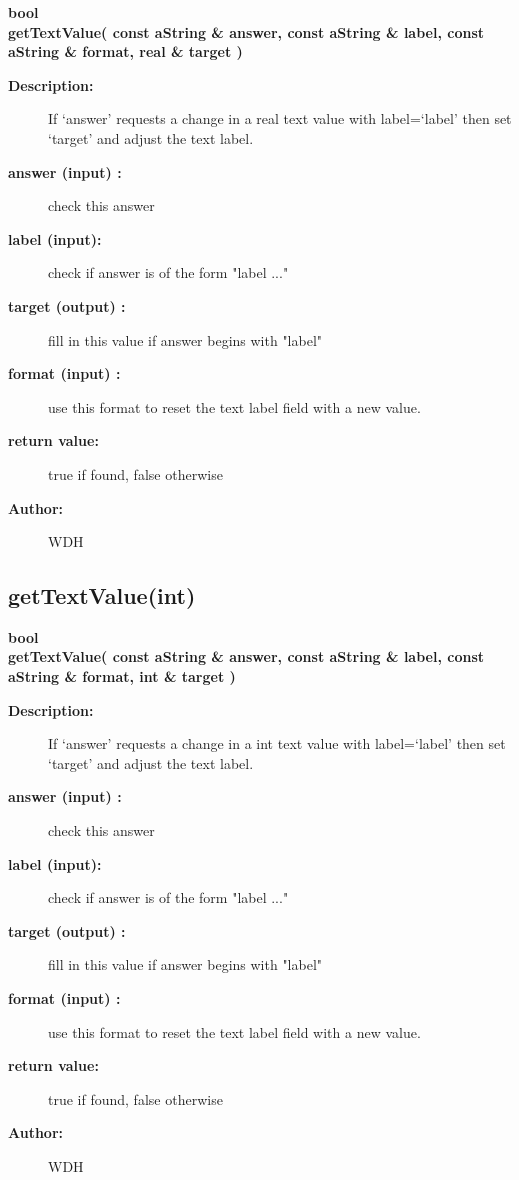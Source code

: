 \begin{flushleft} \textbf{%
bool  \\ 
\settowidth{\DialogDataIncludeArgIndent}{getTextValue(}%
getTextValue( const aString \& answer, const aString \& label, const aString \& format, real \& target )
}\end{flushleft}
\begin{description}
\item[{\bf Description:}]  
    If `answer' requests a change in a real text value with label=`label' 
      then set `target' and adjust the
    text label.
\item[{\bf answer (input) :}]  check this answer
\item[{\bf label (input):}]  check if answer is of the form "label ..."
\item[{\bf target (output) :}]  fill in this value if answer begins with "label"
\item[{\bf format (input) :}]  use this format to reset the text label field with a new value.
\item[{\bf return value:}]  true if found, false otherwise
\item[{\bf Author:}]  WDH
\end{description}
\subsection{getTextValue(int)}
 
\begin{flushleft} \textbf{%
bool  \\ 
\settowidth{\DialogDataIncludeArgIndent}{getTextValue(}%
getTextValue( const aString \& answer, const aString \& label, const aString \& format, int \& target )
}\end{flushleft}
\begin{description}
\item[{\bf Description:}]  
    If `answer' requests a change in a int text value with label=`label' 
      then set `target' and adjust the
    text label.
\item[{\bf answer (input) :}]  check this answer
\item[{\bf label (input):}]  check if answer is of the form "label ..."
\item[{\bf target (output) :}]  fill in this value if answer begins with "label"
\item[{\bf format (input) :}]  use this format to reset the text label field with a new value.
\item[{\bf return value:}]  true if found, false otherwise
\item[{\bf Author:}]  WDH
\end{description}
